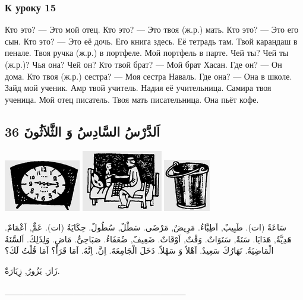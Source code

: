 \documentclass[a5paper]{article}
\begin{document}
\subsubsection{К уроку 15}
Кто это? — Это мой отец. Кто это? — Это твоя (ж.р.) мать. Кто это? — Это его сын. Кто это? — Это её дочь. Его книга здесь. Её тетрадь там. Твой карандаш в пенале. Твоя ручка (ж.р.) в портфеле. Мой портфель в парте. Чей ты? Чей ты (ж.р.)? Чья она? Чей он? Кто твой брат? — Мой брат Хасан. Где он? — Он дома. Кто твоя (ж.р.) сестра? — Моя сестра Наваль. Где она? — Она в школе. Зайд мой ученик. Амр твой учитель. Надия её учительница. Самира твоя ученица. Мой отец писатель. Твоя мать писательница. Она пьёт кофе.

\subsection{اَلدَّرْسُ السَّادِسُ وَ الثَّلاَثُونَ 36}
 \includegraphics[width=1.3126in,height=0.8854in]{images/MuhammadBagauddinprettified-img084.png}   \includegraphics[width=1.3854in,height=1.052in]{images/MuhammadBagauddinprettified-img085.png}   \includegraphics[width=0.802in,height=0.8957in]{images/MuhammadBagauddinprettified-img086.png} 

سَاعَةٌ (ات). طَبِيبٌ, اَطِبَّاءُ. مَرِيضٌ, مَرْضَى. سَطْلٌ, سُطُولٌ. حِكَايَةٌ (ات). عَمٌّ, اَعْمَامٌ. هَدِيَّةٌ, هَدَايَا. سَنَةٌ, سَنَوَاتٌ. وَقْتٌ, اَوْقَاتٌ. ضَعِيفٌ, ضُعَفَاءُ. صَبَاحِىٌّ. مَاضٍ. وَلِذَلِكَ. اَلسَّنَةُ الْمَاضِيَةُ. نَهَارُكَ سَعِيدٌ. اَهْلاً وَ سَهْلاً. دَخَلَ الْجَامِعَةَ. اِنَّ. اِنَّهُ. اَمَا قَرَأَ؟ اَمَا قُلْتُ لَكَ؟ 

زَارَ, يَزُورُ, زِيَارَةٌ.

\_\_\_\_\_\_\_\_\_\_\_\_\_\_\_\_\_\_\_\_\_\_\_\_\_\_\_\_\_
\end{document}
